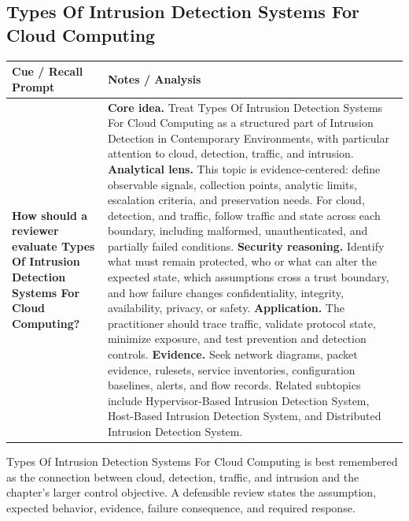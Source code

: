 \documentclass[11pt]{article}
\newcommand{\CornellHeader}{%
\rowcolor{Navy}\color{white}\bfseries Cue / Recall Prompt & \color{white}\bfseries Notes / Analysis\\\hline}
\newcommand{\CornellRow}[2]{%
\cellcolor{CueGray}\RaggedRight\textbf{#1} & \RaggedRight #2\\\hline}
\begin{document}
\subsection*{Types Of Intrusion Detection Systems For Cloud Computing}
\begin{longtable}{>{\RaggedRight\arraybackslash}p{}|>{\RaggedRight\arraybackslash}p{}}
\CornellHeader
\CornellRow{How should a reviewer evaluate Types Of Intrusion Detection Systems For Cloud Computing?}{\textbf{Core idea.} Treat Types Of Intrusion Detection Systems For Cloud Computing as a structured part of Intrusion Detection in Contemporary Environments, with particular attention to cloud, detection, traffic, and intrusion. \textbf{Analytical lens.} This topic is evidence-centered: define observable signals, collection points, analytic limits, escalation criteria, and preservation needs. For cloud, detection, and traffic, follow traffic and state across each boundary, including malformed, unauthenticated, and partially failed conditions. \textbf{Security reasoning.} Identify what must remain protected, who or what can alter the expected state, which assumptions cross a trust boundary, and how failure changes confidentiality, integrity, availability, privacy, or safety. \textbf{Application.} The practitioner should trace traffic, validate protocol state, minimize exposure, and test prevention and detection controls. \textbf{Evidence.} Seek network diagrams, packet evidence, rulesets, service inventories, configuration baselines, alerts, and flow records. Related subtopics include Hypervisor-Based Intrusion Detection System, Host-Based Intrusion Detection System, and Distributed Intrusion Detection System.}
\end{longtable}
\begin{topicsummary}
Types Of Intrusion Detection Systems For Cloud Computing is best remembered as the connection between cloud, detection, traffic, and intrusion and the chapter's larger control objective. A defensible review states the assumption, expected behavior, evidence, failure consequence, and required response.
\end{topicsummary}
\end{document}
